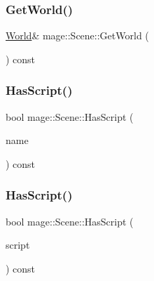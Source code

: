 \subsubsection{\texorpdfstring{Get\+World()}{GetWorld()}}
{\footnotesize\ttfamily \hyperlink{classmage_1_1_world}{World}\& mage\+::\+Scene\+::\+Get\+World (\begin{DoxyParamCaption}{ }\end{DoxyParamCaption}) const}

\hypertarget{classmage_1_1_scene_ad87f96d612fa5087ad3ddcbb73ef05a4}{}\label{classmage_1_1_scene_ad87f96d612fa5087ad3ddcbb73ef05a4} 
\subsubsection{\texorpdfstring{Has\+Script()}{HasScript()}\hspace{0.1cm}{\footnotesize\ttfamily [1/2]}}
{\footnotesize\ttfamily bool mage\+::\+Scene\+::\+Has\+Script (\begin{DoxyParamCaption}\item[{const string \&}]{name }\end{DoxyParamCaption}) const}

\hypertarget{classmage_1_1_scene_a31469e19b181d0cb08bf10c554d28a6d}{}\label{classmage_1_1_scene_a31469e19b181d0cb08bf10c554d28a6d} 
\subsubsection{\texorpdfstring{Has\+Script()}{HasScript()}\hspace{0.1cm}{\footnotesize\ttfamily [2/2]}}
{\footnotesize\ttfamily bool mage\+::\+Scene\+::\+Has\+Script (\begin{DoxyParamCaption}\item[{const \hyperlink{namespacemage_a1e01ae66713838a7a67d30e44c67703e}{Shared\+Ptr}$<$ \hyperlink{classmage_1_1_behavior_script}{Behavior\+Script} $>$}]{script }\end{DoxyParamCaption}) const}

\hypertarget{classmage_1_1_scene_a472443b059c8be0fcd223f6df8378934}{}\label{classmage_1_1_scene_a472443b059c8be0fcd223f6df8378934} 
